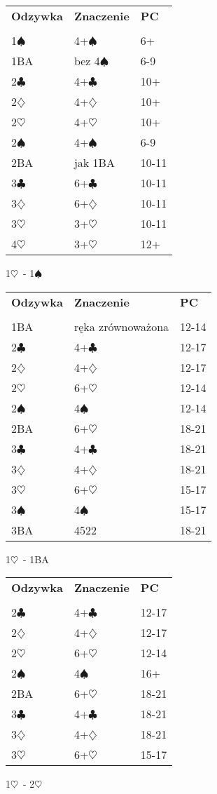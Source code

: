 \documentclass{article}
\renewcommand{\c}{\(\clubsuit\)}
\renewcommand{\d}{\(\diamondsuit\)}
\newcommand{\h}{\(\heartsuit\)}
\newcommand{\s}{\(\spadesuit\)}
\begin{document}
\begin{tabular}{p{2cm} p{10cm} l}
	\textbf{Odzywka} & \textbf{Znaczenie} & \textbf{PC}\\\\
	1\s & 4+\s & 6+ \\
	1BA & bez 4\s & 6-9 \\
	2\c & 4+\c & 10+ \\
	2\d & 4+\d & 10+ \\
	2\h & 4+\h & 10+ \\
	2\s & 4+\s & 6-9 \\
	2BA & jak 1BA & 10-11 \\
	3\c & 6+\c & 10-11 \\
	3\d & 6+\d & 10-11 \\
	3\h & 3+\h & 10-11 \\
	4\h & 3+\h & 12+ \\
\end{tabular}
\begin{center}\LARGE{1\h\ - 1\s}
\end{center}

\begin{tabular}{p{2cm} p{10cm} l}
	\textbf{Odzywka} & \textbf{Znaczenie} & \textbf{PC}\\\\
	1BA & ręka zrównoważona & 12-14 \\
	2\c & 4+\c & 12-17 \\
	2\d & 4+\d & 12-17 \\
	2\h & 6+\h & 12-14 \\
	2\s & 4\s & 12-14 \\
	2BA & 6+\h & 18-21 \\
	3\c & 4+\c & 18-21 \\
	3\d & 4+\d & 18-21 \\
	3\h & 6+\h & 15-17 \\
	3\s & 4\s & 15-17 \\
	3BA & 4522 & 18-21 \\
\end{tabular}
\begin{center}\LARGE{1\h\ - 1BA}
\end{center}

\begin{tabular}{p{2cm} p{10cm} l}
	\textbf{Odzywka} & \textbf{Znaczenie} & \textbf{PC}\\\\
	2\c & 4+\c & 12-17 \\
	2\d & 4+\d & 12-17 \\
	2\h & 6+\h & 12-14 \\
	2\s & 4\s & 16+ \\
	2BA & 6+\h & 18-21 \\
	3\c & 4+\c & 18-21 \\
	3\d & 4+\d & 18-21 \\
	3\h & 6+\h & 15-17 \\
\end{tabular}
\begin{center}\LARGE{1\h\ - 2\h}
\end{center}
\end{document}
